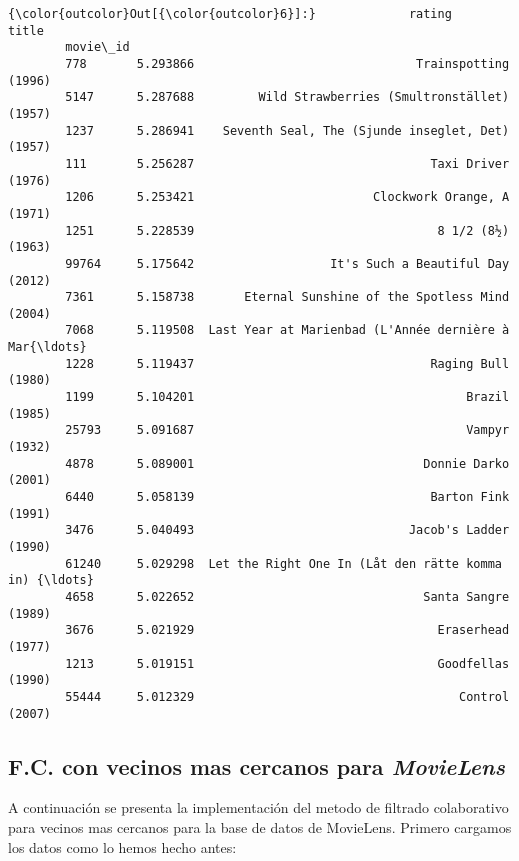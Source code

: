 \documentclass[11pt]{article}
\begin{document}
\begin{Verbatim}[commandchars=\\\{\}]
{\color{outcolor}Out[{\color{outcolor}6}]:}             rating                                              title
        movie\_id
        778       5.293866                               Trainspotting (1996)
        5147      5.287688         Wild Strawberries (Smultronstället) (1957)
        1237      5.286941    Seventh Seal, The (Sjunde inseglet, Det) (1957)
        111       5.256287                                 Taxi Driver (1976)
        1206      5.253421                         Clockwork Orange, A (1971)
        1251      5.228539                                  8 1/2 (8½) (1963)
        99764     5.175642                   It's Such a Beautiful Day (2012)
        7361      5.158738       Eternal Sunshine of the Spotless Mind (2004)
        7068      5.119508  Last Year at Marienbad (L'Année dernière à Mar{\ldots}
        1228      5.119437                                 Raging Bull (1980)
        1199      5.104201                                      Brazil (1985)
        25793     5.091687                                      Vampyr (1932)
        4878      5.089001                                Donnie Darko (2001)
        6440      5.058139                                 Barton Fink (1991)
        3476      5.040493                              Jacob's Ladder (1990)
        61240     5.029298  Let the Right One In (Låt den rätte komma in) {\ldots}
        4658      5.022652                                Santa Sangre (1989)
        3676      5.021929                                  Eraserhead (1977)
        1213      5.019151                                  Goodfellas (1990)
        55444     5.012329                                     Control (2007)
\end{Verbatim}

\subsection{F.C. con vecinos mas cercanos para \emph{MovieLens}}
\label{subsec:a3}

A continuación se presenta la implementación del metodo de filtrado colaborativo para vecinos mas cercanos
 para la base de datos de MovieLens. Primero cargamos los datos como lo hemos hecho antes:
\end{document}
